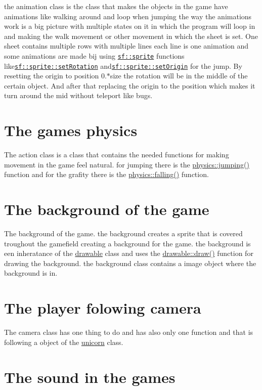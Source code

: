 the animation class is the class that makes the objects in the game have animations like walking around and loop when jumping the way the animations work is a big picture with multiple states on it in which the program will loop in and making the walk movement or other movement in which the sheet is set. One sheet contains multiple rows with multiple lines each line is one animation and some animations are made bij using \href{https://www.sfml-dev.org/documentation/2.0/classsf_1_1Sprite.php}{\tt sf\+::sprite} functions like\href{https://www.sfml-dev.org/documentation/2.0/classsf_1_1Transformable.php#a32baf2bf1a74699b03bf8c95030a38ed}{\tt sf\+::sprite\+::set\+Rotation} and\href{https://www.sfml-dev.org/documentation/2.0/classsf_1_1Transformable.php#aa93a835ffbf3bee2098dfbbc695a7f05}{\tt sf\+::sprite\+::set\+Origin} for the jump. By resetting the origin to position 0.$\ast$size the rotation will be in the middle of the certain object. And after that replacing the origin to the position which makes it turn around the mid without teleport like bugs.\hypertarget{index_physics}{}\section{The game\textquotesingle{}s physics}\label{index_physics}
The action class is a class that contains the needed functions for making movement in the game feel natural. for jumping there is the \hyperlink{classphysics_aaf1c57aa6e35b9c83ccbfdfa8c18468c}{physics\+::jumping()} function and for the grafity there is the \hyperlink{classphysics_acca1ee2fb8b760b6e4ee61ae7c2ee3da}{physics\+::falling()} function.\hypertarget{index_background}{}\section{The background of the game}\label{index_background}
The background of the game. the background creates a sprite that is covered troughout the gamefield creating a background for the game. the background is een inheratance of the \hyperlink{classdrawable}{drawable} class and uses the \hyperlink{classdrawable_a4e49e2c1121704c83ce24c5f48dd910f}{drawable\+::draw()} function for drawing the background. the background class contains a image object where the background is in.\hypertarget{index_camera}{}\section{The player folowing camera}\label{index_camera}
The camera class has one thing to do and has also only one function and that is following a object of the \hyperlink{classunicorn}{unicorn} class.\hypertarget{index_sound}{}\section{The sound in the games}\label{index_sound}
